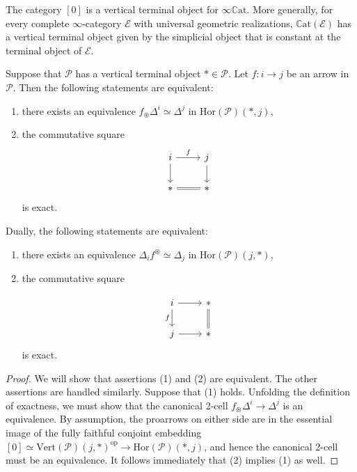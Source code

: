 \documentclass[a4paper, 11pt]{amsart}
\numberwithin{theorem}{section}
\theoremstyle{definition}
\newcommand{\op}{\mathrm{op}}
\renewcommand{\P}{\mathscr{P}}
\newcommand{\E}{\mathscr{E}}
\renewcommand{\Vert}{\mathrm{Vert}}
\newcommand{\Hor}{\mathrm{Hor}}
\newcommand{\CCAT}{\mathbb{C}\mathrm{at}}
\begin{document}
\begin{example}
	The category $[0]$ is a vertical terminal object for $\infty\CCAT$. More generally, for every complete $\infty$-category $\E$ with universal geometric realizations, $\CCAT(\E)$ has a vertical terminal object
	given by the simplicial object that is constant at the terminal object of $\E$.
\end{example}

\begin{proposition}\label{prop.initiality-finality}
	Suppose that $\P$ has a vertical terminal object $\ast \in \P$.
	Let $f : i \rightarrow j$ be an arrow in $\P$. Then the following statements are equivalent:
	\begin{enumerate}
		\item there exists an equivalence $f_\circledast \Delta^i \simeq \Delta^j$ in  $\Hor(\P)(\ast, j)$,
		\item the commutative square
		\[
			\begin{tikzcd}
				i \arrow[r,"f"]\arrow[d] & j \arrow[d] \\ 
				\ast \arrow[r, equal] & \ast
			\end{tikzcd}
		\]
		is exact.
	\end{enumerate}
	Dually, the following statements are equivalent:
	\begin{enumerate}[label=(\roman*)]
		\item there exists an equivalence $\Delta_i f^\circledast  \simeq \Delta_j$ in $\Hor(\P)(j, \ast)$,
		\item the commutative square
		
		\[
			\begin{tikzcd}
				i \arrow[r]\arrow[d, "f"'] & \ast \arrow[d,equal] \\ 
				j \arrow[r] & \ast
			\end{tikzcd}
		\]
		is exact.
	\end{enumerate}
\end{proposition}
\begin{proof}
	We will show that assertions (1) and (2) are equivalent. 
	The other assertions are handled similarly.
	Suppose that (1) holds. Unfolding the definition of exactness, we must show that 
	the canonical 2-cell
	$f_\circledast \Delta^i \rightarrow \Delta^j$ is an equivalence. By assumption, 
	the proarrows on either side are in the essential image of
	the fully faithful conjoint embedding $[0] \simeq \Vert(\P)(j, \ast)^\op \rightarrow \Hor(\P)(\ast, j)$, 
	and hence the canonical 2-cell must be an equivalence. It follows immediately that (2) implies (1) as well.
\end{proof}
\end{document}
